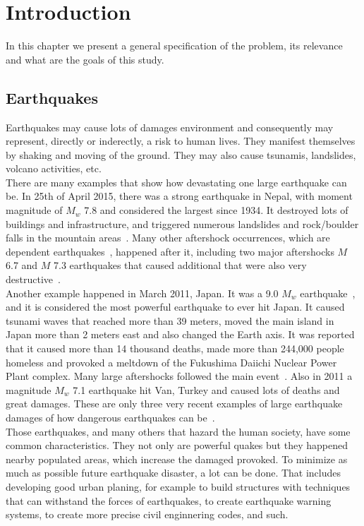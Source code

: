 \chapter{Introduction}\label{chapter1}
In this chapter we present a general specification of the problem, its relevance and what are the goals of this study.

\section{Earthquakes}
Earthquakes may cause lots of damages environment and consequently may represent, directly or inderectly, a risk to human lives. They manifest themselves by shaking and moving of the ground. They may also cause tsunamis, landslides, volcano activities, etc.\\


There are many examples that show how devastating one large earthquake can be. In 25th of April 2015, there was a strong earthquake in Nepal, with moment magnitude of $M_w$ 7.8 and considered the largest since 1934. It destroyed lots of buildings and
infrastructure, and triggered numerous landslides and rock/boulder falls in the mountain areas~\cite{wilkinson20152015}. Many other aftershock occurrences, which are dependent earthquakes~\cite{van2012seismicity}, happened after it, including two major aftershocks $M$ 6.7 and $M$ 7.3 earthquakes that caused additional that were also very destructive~\cite{wilkinson20152015}.\\

Another example happened in March 2011, Japan. It was a 9.0 $M_w$ earthquake~\cite{simons20112011}, and it is considered the most powerful earthquake to ever hit Japan. It caused tsunami waves that reached more than 39 meters, moved the main island in Japan more than 2 meters east and also changed the Earth axis. It was reported that it caused more than 14 thousand deaths, made more than 244,000 people homeless and provoked a meltdown of the Fukushima Daiichi Nuclear Power Plant complex. Many large aftershocks followed the main event~\cite{mimura2011damage}. Also in 2011 a magnitude $M_w$ 7.1 earthquake hit Van, Turkey and caused lots of deaths and great damages. These are only three very recent examples of large earthquake damages of how dangerous earthquakes can be~\cite{irmak2012source}.\\

Those earthquakes, and many others that hazard the human society, have some common characteristics. They not only are powerful quakes but they happened nearby populated areas, which increase the damaged provoked. To minimize as much as possible future earthquake disaster, a lot can be done. That includes developing good urban planing, for example to build structures with techniques that can withstand the forces of earthquakes, to create earthquake warning systems, to create more precise civil enginnering codes, and such.\\

